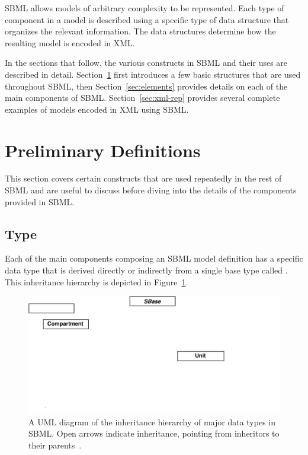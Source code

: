 \documentclass[10pt]{cekarticle}
\newcommand{\vref}[1]{\ref{#1}}
\begin{document}
SBML allows models of arbitrary complexity to be represented.  Each type of
component in a model is described using a specific type of data structure
that organizes the relevant information.  The data structures determine how
the resulting model is encoded in XML.

In the sections that follow, the various constructs in SBML and their uses
are described in detail.  Section~\ref{sec:general} first introduces a few
basic structures that are used throughout SBML, then
Section~\ref{sec:elements} provides details on each of the main components
of SBML.  Section~\ref{sec:xml-rep} provides several complete examples of
models encoded in XML using SBML.


\section{Preliminary Definitions}
\label{sec:general}

This section covers certain constructs that are used repeatedly in the rest
of SBML and are useful to discuss before diving into the details of the
components provided in SBML.

\subsection{Type }
\label{sec:sbase}

Each of the main components composing an SBML model definition has a
specific data type that is derived directly or indirectly from a single
base type called .  This inheritance hierarchy is depicted in
Figure~\vref{fig:top-level}.

\begin{figure}[ht]
  \vspace*{8pt}
  \centering
  \includegraphics[scale = 0.7]{top-level}
  \caption{A UML diagram of the inheritance hierarchy of major data types
    in SBML.  Open arrows indicate inheritance, pointing from inheritors to 
    their parents~\citep{eriksson:1998,oestereich:1999}.}
  \label{fig:top-level}
\end{figure}
\end{document}
